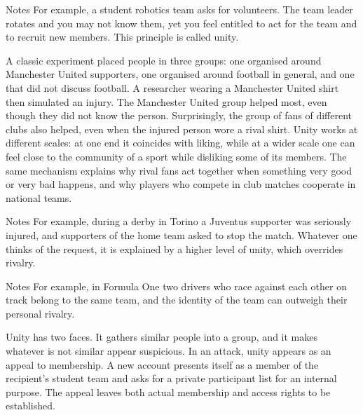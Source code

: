 \begin{nota}{Notes}
	For example, a student robotics team asks for volunteers. The team leader rotates and you may not know them, yet you feel entitled to act for the team and to recruit new members. This principle is called unity.
\end{nota}

A classic experiment placed people in three groups: one organised around Manchester United supporters, one organised around football in general, and one that did not discuss football. A researcher wearing a Manchester United shirt then simulated an injury. The Manchester United group helped most, even though they did not know the person. Surprisingly, the group of fans of different clubs also helped, even when the injured person wore a rival shirt. Unity works at different scales: at one end it coincides with liking, while at a wider scale one can feel close to the community of a sport while disliking some of its members. The same mechanism explains why rival fans act together when something very good or very bad happens, and why players who compete in club matches cooperate in national teams.

\begin{nota}{Notes}
	For example, during a derby in Torino a Juventus supporter was seriously injured, and supporters of the home team asked to stop the match. Whatever one thinks of the request, it is explained by a higher level of unity, which overrides rivalry.
\end{nota}

\begin{nota}{Notes}
	For example, in Formula One two drivers who race against each other on track belong to the same team, and the identity of the team can outweigh their personal rivalry.
\end{nota}

Unity has two faces. It gathers similar people into a group, and it makes whatever is not similar appear suspicious. In an attack, unity appears as an appeal to membership. A new account presents itself as a member of the recipient's student team and asks for a private participant list for an internal purpose. The appeal leaves both actual membership and access rights to be established.


